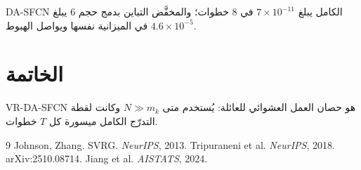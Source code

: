 ﻿\documentclass[12pt,a4paper]{article}
\begin{document}
\textenglish{DA-SFCN} الكامل يبلغ $7\times 10^{-11}$ في 8 خطوات؛ والمخفَّض
التباين بدمج حجم 6 يبلغ $4.6\times 10^{-5}$ في الميزانية نفسها ويواصل الهبوط.

\section{الخاتمة}
\textenglish{VR-DA-SFCN} هو حصان العمل العشوائي للعائلة: يُستخدم متى
$N\gg m_k$ وكانت لقطة التدرّج الكامل ميسورة كل $T$ خطوات.

\begin{english}
\begin{thebibliography}{9}
 Johnson, Zhang. SVRG. \textit{NeurIPS}, 2013.
 Tripuraneni et al. \textit{NeurIPS}, 2018.
 arXiv:2510.08714.
 Jiang et al. \textit{AISTATS}, 2024.
\end{thebibliography}
\end{english}
\end{document}
